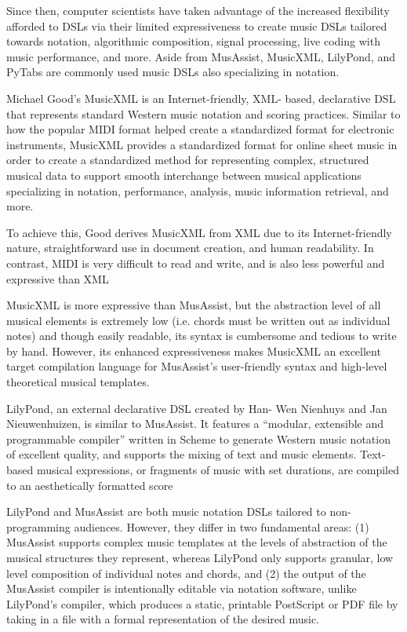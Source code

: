 \documentclass{article}
\begin{document}
Since then, computer scientists have taken advantage of the increased flexibility afforded to DSLs via their limited expressiveness to create music DSLs tailored towards notation, algorithmic composition, signal processing, live coding with music performance, and more. Aside from MusAssist, MusicXML, LilyPond, and PyTabs are commonly used music DSLs also specializing in notation.

Michael Good’s MusicXML is an Internet-friendly, XML- based, declarative DSL that represents standard Western music notation and scoring practices. Similar to how the popular MIDI format helped create a standardized format for electronic instruments, MusicXML provides a standardized format for online sheet music in order to create a standardized method for representing complex, structured musical data to support smooth interchange between musical applications specializing in notation, performance, analysis, music information retrieval, and more.\cite{good_2013}

To achieve this, Good derives MusicXML from XML due to its Internet-friendly nature, straightforward use in document creation, and human readability. In contrast, MIDI is very difficult to read and write, and is also less powerful and expressive than XML  \cite{good_2001}

MusicXML is more expressive than MusAssist, but the abstraction level of all musical elements is extremely low (i.e. chords must be written out as individual notes) and though easily readable, its syntax is cumbersome and tedious to write by hand. However, its enhanced expressiveness makes MusicXML an excellent target compilation language for MusAssist’s user-friendly syntax and high-level theoretical musical templates.

LilyPond, an external declarative DSL created by Han- Wen Nienhuys and Jan Nieuwenhuizen, is similar to MusAssist. It features a “modular, extensible and programmable compiler” written in Scheme to generate Western music notation of excellent quality, and supports the mixing of text and music elements. Text-based musical expressions, or fragments of music with set durations, are compiled to an aesthetically formatted score \cite{nienhuys_nieuwenhuizen_2003}

LilyPond and MusAssist are both music notation DSLs tailored to non-programming audiences. However, they differ in two fundamental areas: (1) MusAssist supports complex music templates at the levels of abstraction of the musical structures they represent, whereas LilyPond only supports granular, low level composition of individual notes and chords, and (2) the output of the MusAssist compiler is intentionally editable via notation software, unlike LilyPond’s compiler, which produces a static, printable PostScript or PDF file by taking in a file with a formal representation of the desired music. 
\cite{nienhuys_nieuwenhuizen_2003}
\end{document}
